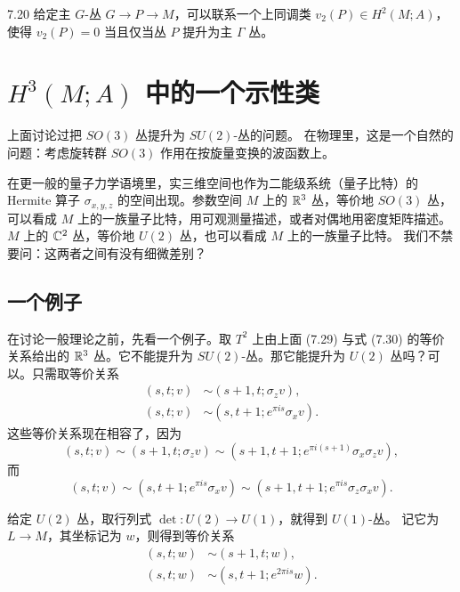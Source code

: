 \begin{proposition}{7.20}
给定主 $G$-丛 $G\to P\to M$，可以联系一个上同调类 $v_2(P)\in H^2(M;A)$，
使得 $v_2(P)=0$ 当且仅当丛 $P$ 提升为主 $\Gamma$ 丛。
\end{proposition}


\section{$H^3(M;A)$ 中的一个示性类}

上面讨论过把 $SO(3)$ 丛提升为 $SU(2)$-丛的问题。
在物理里，这是一个自然的问题：考虑旋转群 $SO(3)$ 作用在按旋量变换的波函数上。

在更一般的量子力学语境里，实三维空间也作为二能级系统（量子比特）的 Hermite 算子
$\sigma_{x,y,z}$ 的空间出现。参数空间 $M$ 上的 $\mathbb{R}^3$ 丛，等价地 $SO(3)$ 丛，
可以看成 $M$ 上的一族量子比特，用可观测量描述，或者对偶地用密度矩阵描述。
$M$ 上的 $\mathbb{C}^2$ 丛，等价地 $U(2)$ 丛，也可以看成 $M$ 上的一族量子比特。
我们不禁要问：这两者之间有没有细微差别？

\subsection{一个例子}

在讨论一般理论之前，先看一个例子。取 $T^2$ 上由上面 (7.29) 与式 (7.30) 的等价关系给出的
$\mathbb{R}^3$ 丛。它不能提升为 $SU(2)$-丛。那它能提升为 $U(2)$ 丛吗？可以。只需取等价关系
\begin{align}
(s,t;v)&\sim(s+1,t;\sigma_zv), \tag{7.40}\\
(s,t;v)&\sim(s,t+1;e^{\pi is}\sigma_xv). \tag{7.41}
\end{align}
这些等价关系现在相容了，因为
\begin{equation}
(s,t;v)\sim(s+1,t;\sigma_zv)\sim(s+1,t+1;e^{\pi i(s+1)}\sigma_x\sigma_zv),
\tag{7.42}
\end{equation}
而
\begin{equation}
(s,t;v)\sim(s,t+1;e^{\pi is}\sigma_xv)\sim(s+1,t+1;e^{\pi is}\sigma_z\sigma_xv).
\tag{7.43}
\end{equation}

给定 $U(2)$ 丛，取行列式 $\det:U(2)\to U(1)$，就得到 $U(1)$-丛。
记它为 $L\to M$，其坐标记为 $w$，则得到等价关系
\begin{align}
(s,t;w)&\sim(s+1,t;w), \tag{7.44}\\
(s,t;w)&\sim(s,t+1;e^{2\pi is}w). \tag{7.45}
\end{align}

